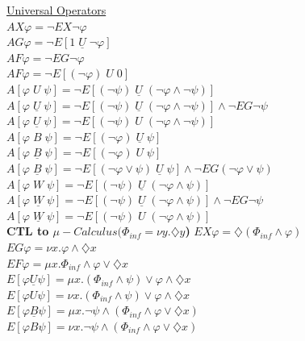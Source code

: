 \documentclass{article}
\begin{document}
\begin{multicols}{4}
\underline{Universal Operators} \\
$AX\varphi =  \neg EX \neg \varphi \qquad$ \\
$AG\varphi=  \neg E[1 \; \underline{U} \; \neg \varphi] $ \\
$AF\varphi =  \neg EG \neg \varphi $ \\
$AF\varphi =  \neg E[(\neg \varphi)\; U\; 0] $ \\
$A[\varphi \; U\; \psi]=  \neg E[(\neg \psi)\; \underline{U} \; (\neg \varphi \wedge \neg \psi)] $ \\
$A[\varphi \; \underline{U} \; \psi] =  \neg E[(\neg \psi) \; \underline{U}\; (\neg \varphi \wedge \neg \psi)]\wedge \neg EG \neg \psi$ \\
$A[\varphi \; \underline{U} \; \psi] =  \neg E[(\neg \psi) \; U\; (\neg \varphi \wedge \neg \psi)]$ \\
$A[\varphi \; B\; \psi]=  \neg E[(\neg \varphi)\; \underline{U} \; \psi] $ \\
$A[\varphi \; \underline{B}\; \psi]=  \neg E[(\neg \varphi)\; U \; \psi] $ \\
$A[\varphi \; \underline{B} \; \psi] =  \neg E[(\neg \varphi \vee \psi) \; \underline{U}\; \psi] \wedge \neg EG(\neg \varphi \vee \psi)$ \\
$A[\varphi \; W\; \psi]=  \neg E[(\neg \psi) \; \underline{U}\; (\neg \varphi \wedge \psi)]$ \\
$A[\varphi \; \underline{W} \; \psi] =  \neg E[(\neg \psi) \; \underline{U}\; (\neg \varphi \wedge \psi)] \wedge \neg EG\neg \psi $ \\
$A[\varphi \; \underline{W} \; \psi] =  \neg E[(\neg \psi) \; U\; (\neg \varphi \wedge \psi)]$\\
\textbf{CTL to $\mu -Calculus (\Phi _{inf} = \nu y.\diamondsuit y$)}
$EX\varphi = \diamondsuit (\Phi_{inf} \wedge \varphi)$ \\
$EG\varphi = \nu x.\varphi \wedge \diamondsuit x $ \\
$EF\varphi = \mu x.\Phi_{inf} \wedge \varphi \vee \diamondsuit x  $ \\
$E[ \varphi \underline{U} \psi] = \mu x.(\Phi_{inf} \wedge \psi) \vee \varphi \wedge \diamondsuit x $ \\
$E[ \varphi U \psi] = \nu x.(\Phi_{inf} \wedge \psi) \vee \varphi \wedge \diamondsuit x $ \\
$E[ \varphi \underline{B} \psi] = \mu x.\neg\psi \wedge (\Phi_{inf} \wedge \varphi \vee \diamondsuit x) $ \\
$E[ \varphi B \psi] = \nu x.\neg\psi \wedge (\Phi_{inf} \wedge \varphi \vee \diamondsuit x) $ \\

\end{multicols}
\end{document}
